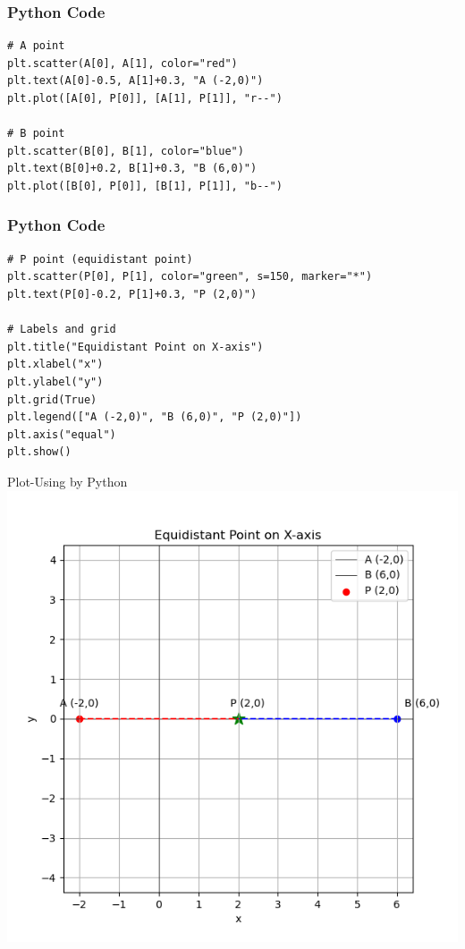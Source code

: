 \documentclass{beamer}
\begin{document}
\begin{frame}[fragile]
    \frametitle{Python Code}
  \begin{lstlisting}
# A point
plt.scatter(A[0], A[1], color="red")
plt.text(A[0]-0.5, A[1]+0.3, "A (-2,0)")
plt.plot([A[0], P[0]], [A[1], P[1]], "r--")

# B point
plt.scatter(B[0], B[1], color="blue")
plt.text(B[0]+0.2, B[1]+0.3, "B (6,0)")
plt.plot([B[0], P[0]], [B[1], P[1]], "b--")
\end{lstlisting}
\end{frame}

\begin{frame}[fragile]
    \frametitle{Python Code}
        \begin{lstlisting}
# P point (equidistant point)
plt.scatter(P[0], P[1], color="green", s=150, marker="*")
plt.text(P[0]-0.2, P[1]+0.3, "P (2,0)")

# Labels and grid
plt.title("Equidistant Point on X-axis")
plt.xlabel("x")
plt.ylabel("y")
plt.grid(True)
plt.legend(["A (-2,0)", "B (6,0)", "P (2,0)"])
plt.axis("equal")
plt.show()
\end{lstlisting}
\end{frame}

\begin{frame}{Plot-Using by Python}
    \centering
    \includegraphics[width=\columnwidth, height=0.8\textheight, keepaspectratio]{figs/fig2.png}     
\end{frame}
\end{document}
